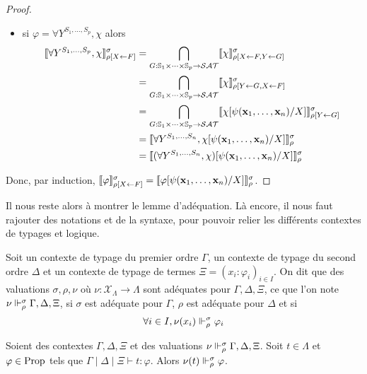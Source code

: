 \documentclass{article}
\begin{document}
\begin{proof}
\begin{itemize}
  \item si $\varphi = \forall Y^{S_1,\ldots,S_p},\chi$ alors
    \begin{align*}
      \llbracket \forall Y^{S_1,\ldots,S_p}, \chi \rrbracket_{\rho[X\leftarrow F]}^\sigma &= \bigcap_{G : \mathbb{S}_1\times\cdots\times\mathbb{S}_p \to \mathcal {SAT}}\llbracket \chi \rrbracket_{\rho[X\leftarrow F, Y\leftarrow G]}^\sigma\\
      &= \bigcap_{G : \mathbb{S}_1\times\cdots\times\mathbb{S}_p\to\mathcal {SAT}}\llbracket \chi \rrbracket_{\rho[Y\leftarrow G, X\leftarrow F]}^\sigma\\
      &= \bigcap_{G : \mathbb{S}_1\times\cdots\times\mathbb{S}_p\to\mathcal {SAT}}\llbracket \chi[\psi(\mathbf{x}_1,\ldots,\mathbf{x}_n)/X] \rrbracket_{\rho[Y\leftarrow G]}^\sigma\\
      &= \llbracket \forall Y^{S_1,\ldots,S_n}, \chi[\psi(\mathbf{x}_1,\ldots,\mathbf{x}_n)/X] \rrbracket_\rho^\sigma\\
      &= \llbracket (\forall Y^{S_1,\ldots,S_n}, \chi)[\psi(\mathbf{x}_1,\ldots,\mathbf{x}_n)/X] \rrbracket_\rho^\sigma
    \end{align*}
  \end{itemize}
  Donc, par induction, $\llbracket \varphi \rrbracket_{\rho[X\leftarrow F]}^\sigma = \llbracket \varphi[\psi(\mathbf{x}_1,\ldots,\mathbf{x}_n)/X] \rrbracket_\rho^\sigma$.
\end{proof}

Il nous reste alors à montrer le lemme d'adéquation. Là encore, il nous faut rajouter des notations et de la syntaxe, pour pouvoir relier les différents contextes de typages et logique.

\begin{defi}
  Soit un contexte de typage du premier ordre $\Gamma$, un contexte de typage du second ordre $\Delta$ et un contexte de typage de termes $\Xi = (x_i : \varphi_i)_{i\in I}$. On dit que des valuations $\sigma, \rho, \nu$ où $\nu : \mathcal X_\Lambda \to \Lambda$ sont adéquates pour $\Gamma,\Delta,\Xi$, ce que l'on note $\nu\Vdash_\rho^\sigma \Gamma,\Delta,\Xi$, si $\sigma$ est adéquate pour $\Gamma$, $\rho$ est adéquate pour $\Delta$ et si
  \[\forall i \in I, \nu(x_i)\Vdash_\rho^\sigma\varphi_i\]
\end{defi}

\begin{lem}[Adéquation]
  Soient des contextes $\Gamma,\Delta,\Xi$ et des valuations $\nu\Vdash_\rho^\sigma \Gamma,\Delta,\Xi$. Soit $t\in\Lambda$ et $\varphi\in\mathrm{Prop}$ tels que $\Gamma\mid\Delta\mid\Xi\vdash t : \varphi$. Alors $\nu(t) \Vdash_\rho^\sigma \varphi$.
\end{lem}
\end{document}
